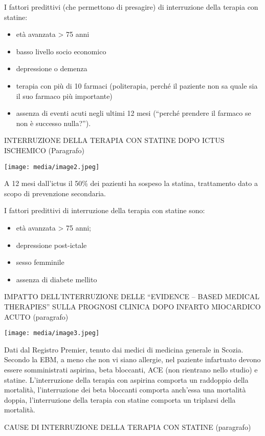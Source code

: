 \documentclass[]{article}
\begin{document}
I fattori predittivi (che permettono di presagire) di interruzione della
terapia con statine:

\begin{itemize}
\item
  età avanzata \textgreater{} 75 anni
\item
  basso livello socio economico
\item
  depressione o demenza
\item
  terapia con più di 10 farmaci (politerapia, perché il paziente non sa
  quale sia il suo farmaco più importante)
\item
  assenza di eventi acuti negli ultimi 12 mesi (``perché prendere il
  farmaco se non è successo nulla?'').
\end{itemize}

INTERRUZIONE DELLA TERAPIA CON STATINE DOPO ICTUS ISCHEMICO (Paragrafo)

\texttt{[image: media/image2.jpeg]}

A 12 mesi dall'ictus il 50\% dei pazienti ha sospeso la statina,
trattamento dato a scopo di prevenzione secondaria.

I fattori predittivi di interruzione della terapia con statine sono:

\begin{itemize}
\item
  età avanzata \textgreater{} 75 anni;
\item
  depressione post-ictale
\item
  sesso femminile
\item
  assenza di diabete mellito
\end{itemize}

IMPATTO DELL'INTERRUZIONE DELLE ``EVIDENCE -- BASED MEDICAL THERAPIES''
SULLA PROGNOSI CLINICA DOPO INFARTO MIOCARDICO ACUTO (paragrafo)

\texttt{[image: media/image3.jpeg]}

Dati dal Registro Premier, tenuto dai medici di medicina generale in
Scozia. Secondo la EBM, a meno che non vi siano allergie, nel paziente
infartuato devono essere somministrati aspirina, beta bloccanti, ACE
(non rientrano nello studio) e statine. L'interruzione della terapia con
aspirina comporta un raddoppio della mortalità, l'interruzione dei beta
bloccanti comporta anch'essa una mortalità doppia, l'interruzione della
terapia con statine comporta un triplarsi della mortalità.

CAUSE DI INTERRUZIONE DELLA TERAPIA CON STATINE (paragrafo)
\end{document}
